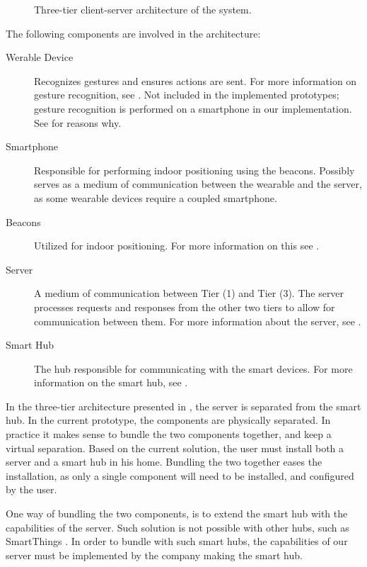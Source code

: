 \begin{figure}[H]
  \centering
  
  \caption{Three-tier client-server architecture of the system.}
  \label{fig:architecture}
\end{figure}

The following components are involved in the architecture:
\begin{description}
    \item[Werable Device] Recognizes gestures and ensures actions are sent. For more information on gesture recognition, see . Not included in the implemented prototypes; gesture recognition is performed on a smartphone in our implementation. See  for reasons why. 
    \item[Smartphone] Responsible for performing indoor positioning using the beacons. Possibly serves as a medium of communication between the wearable and the server, as some wearable devices require a coupled smartphone.
    \item[Beacons] Utilized for indoor positioning. For more information on this see .
    \item[Server] A medium of communication between Tier (1) and Tier (3). The server processes requests and responses from the other two tiers to allow for communication between them. For more information about the server, see .
    \item[Smart Hub] The hub responsible for communicating with the smart devices. For more information on the smart hub, see .
\end{description}

In the three-tier architecture presented in , 
the server is separated from the smart hub. 
In the current prototype, 
the components are physically separated. 
In practice it makes sense to bundle the two components together, 
and keep a virtual separation. 
Based on the current solution, 
the user must install both a server and a smart hub in his home. 
Bundling the two together eases the installation, 
as only a single component will need to be installed, 
and configured by the user.

One way of bundling the two components, 
is to extend the smart hub with the capabilities of the server.
Such solution is not possible with other hubs, such as SmartThings \cite{SMARTTHINGS}.
In order to bundle with such smart hubs, 
the capabilities of our server must be implemented by the company making the smart hub. 


